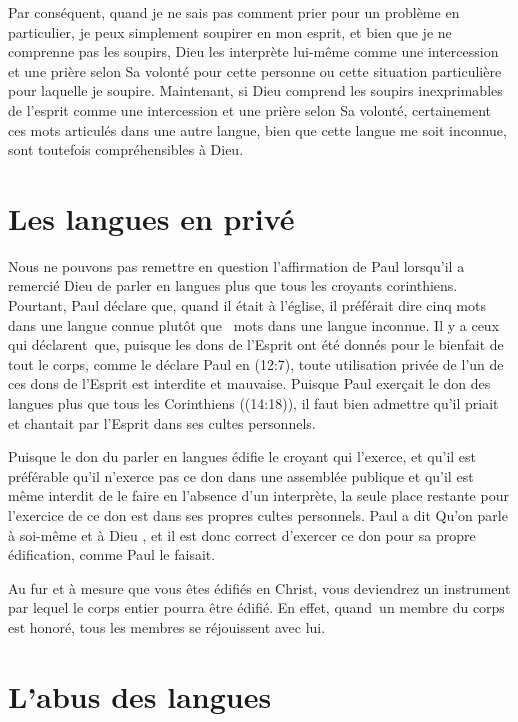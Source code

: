 Par conséquent, quand je ne sais pas comment prier pour un problème en particulier,
 je peux simplement soupirer en mon esprit, et bien que je ne comprenne pas
 les soupirs, Dieu les interprète lui-même comme une intercession
 et une prière selon Sa volonté pour cette personne ou cette situation
 particulière pour laquelle je soupire. Maintenant, si Dieu comprend
 les soupirs inexprimables de l'esprit comme une intercession
 et une prière selon Sa volonté, certainement ces mots articulés
 dans une autre langue, bien que cette langue me soit inconnue,
 sont toutefois compréhensibles à Dieu.


\section{Les langues en priv\'e}

Nous ne pouvons pas remettre en question l'affirmation de Paul lorsqu'il
 a remercié Dieu de parler en langues plus que tous les croyants corinthiens.
 Pourtant, Paul déclare que, quand il était à l'église, il préférait dire
 cinq mots dans une langue connue plutôt que ~mots
 dans une langue inconnue. Il y a ceux qui déclarent~que, puisque les dons
 de l'Esprit ont été donnés pour le bienfait de tout le corps, comme le déclare
 Paul en (12:7), toute utilisation privée
 de l'un de ces dons de l'Esprit est interdite et mauvaise.
 Puisque Paul exerçait le don des langues plus que tous les Corinthiens
 ((14:18)), il faut bien admettre qu'il priait et chantait
 par l'Esprit dans ses cultes personnels.

Puisque le don du parler en langues édifie le croyant qui l'exerce,
 et qu'il est préférable qu'il n'exerce pas ce don dans une assemblée publique
 et qu'il est même interdit de le faire en l'absence d'un interprète,
 la seule place restante pour l'exercice de ce don est dans ses propres
 cultes personnels. Paul a dit\frcolon{}
 \Og Qu'on parle à soi-même et à Dieu \Fg{}, et il est donc correct
 d'exercer ce don pour sa propre édification, comme Paul le faisait.

Au fur et à mesure que vous êtes édifiés en Christ, vous deviendrez
 un instrument par lequel le corps entier pourra être édifié.
 En effet, quand~un membre du corps est honoré, tous les membres
 se réjouissent avec lui.


\section{L'abus des langues}


